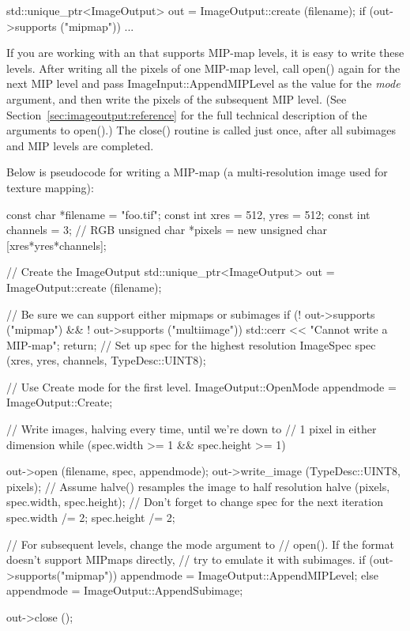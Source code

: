 \begin{code}
        std::unique_ptr<ImageOutput> out = ImageOutput::create (filename);
        if (out->supports ("mipmap"))
            ...
\end{code}

If you are working with an \ImageOutput that supports MIP-map levels, it
is easy to write these levels.  After writing all the pixels of one
MIP-map level, 
call {\cf open()} again for the next MIP level and pass
{\cf ImageInput::AppendMIPLevel} as the value for the \emph{mode}
argument, and then write the pixels of the subsequent MIP level.
(See Section~\ref{sec:imageoutput:reference} for
the full technical description of the arguments to {\cf open()}.)  The
{\cf close()} routine is called just once, after all subimages and MIP
levels are completed.

Below is pseudocode for writing a MIP-map (a multi-resolution image
used for texture mapping):

\begin{code}
        const char *filename = "foo.tif";
        const int xres = 512, yres = 512;
        const int channels = 3;  // RGB
        unsigned char *pixels = new unsigned char [xres*yres*channels];

        // Create the ImageOutput
        std::unique_ptr<ImageOutput> out = ImageOutput::create (filename);

        // Be sure we can support either mipmaps or subimages
        if (! out->supports ("mipmap") && ! out->supports ("multiimage")) {
            std::cerr << "Cannot write a MIP-map\n";
            return;
        }
        // Set up spec for the highest resolution
        ImageSpec spec (xres, yres, channels, TypeDesc::UINT8);

        // Use Create mode for the first level.
        ImageOutput::OpenMode appendmode = ImageOutput::Create;

        // Write images, halving every time, until we're down to
        // 1 pixel in either dimension
        while (spec.width >= 1 && spec.height >= 1) {
            out->open (filename, spec, appendmode);
            out->write_image (TypeDesc::UINT8, pixels);
            // Assume halve() resamples the image to half resolution
            halve (pixels, spec.width, spec.height);
            // Don't forget to change spec for the next iteration
            spec.width /= 2;
            spec.height /= 2;

            // For subsequent levels, change the mode argument to
            // open().  If the format doesn't support MIPmaps directly,
            // try to emulate it with subimages.
            if (out->supports("mipmap"))
                appendmode = ImageOutput::AppendMIPLevel;
            else
                appendmode = ImageOutput::AppendSubimage;
        }
        out->close ();
\end{code}

